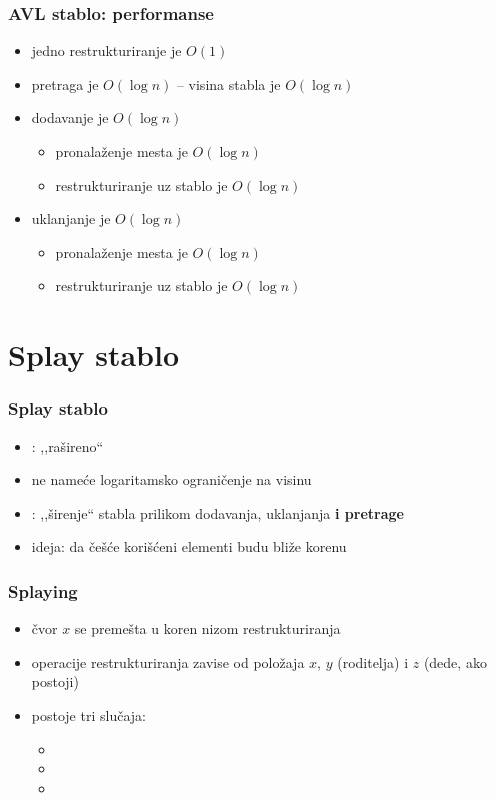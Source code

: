 \documentclass[compress]{beamer}
\begin{document}
\begin{frame}[fragile]
  \frametitle{AVL stablo: performanse}
  \begin{itemize}
    \item jedno restrukturiranje je $O(1)$ 
    \item pretraga je $O(\log n)$ -- visina stabla je $O(\log n)$
    \item dodavanje je $O(\log n)$
    \begin{itemize}
      \item pronalaženje mesta je $O(\log n)$
      \item restrukturiranje uz stablo je $O(\log n)$
    \end{itemize}
    \item uklanjanje je $O(\log n)$
    \begin{itemize}
      \item pronalaženje mesta je $O(\log n)$
      \item restrukturiranje uz stablo je $O(\log n)$
    \end{itemize}
  \end{itemize}
\end{frame}

\section[Splay stablo]{Splay stablo}
\begin{frame}[fragile]
  \frametitle{Splay stablo}
  \begin{itemize}
    \item {}: ,,rašireno`` 
    \item ne nameće logaritamsko ograničenje na visinu
    \item {}: ,,širenje`` stabla prilikom dodavanja, uklanjanja \textbf{i pretrage}
    \item ideja: da češće korišćeni elementi budu bliže korenu
  \end{itemize}
\end{frame}

\begin{frame}[fragile]
  \frametitle{Splaying}
  \begin{itemize}
    \item čvor $x$ se premešta u koren nizom restrukturiranja 
    \item operacije restrukturiranja zavise od položaja $x$, $y$ (roditelja) i $z$ (dede, ako postoji)
    \item postoje tri slučaja:
    \begin{itemize}
      \item {}
      \item {}
      \item {}
    \end{itemize}
  \end{itemize}
\end{frame}
\end{document}

